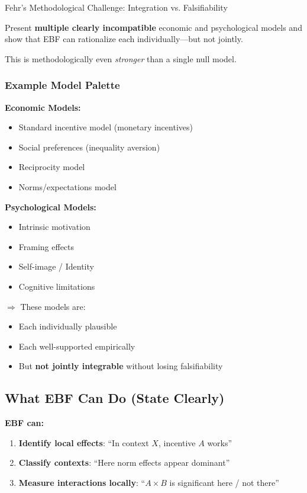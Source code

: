 \begin{chapter}{Fehr's Methodological Challenge: Integration vs. Falsifiability}
\begin{tcolorbox}[colback=green!5!white,colframe=green!75!black,title=\textbf{The Multiple Models Strategy}]
Present \textbf{multiple clearly incompatible} economic and psychological models
and show that EBF can rationalize each individually---but not jointly.

This is methodologically even \textit{stronger} than a single null model.
\end{tcolorbox}

\subsubsection{Example Model Palette}

\textbf{Economic Models:}
\begin{itemize}[noitemsep]
    \item Standard incentive model (monetary incentives)
    \item Social preferences (inequality aversion)
    \item Reciprocity model
    \item Norms/expectations model
\end{itemize}

\textbf{Psychological Models:}
\begin{itemize}[noitemsep]
    \item Intrinsic motivation
    \item Framing effects
    \item Self-image / Identity
    \item Cognitive limitations
\end{itemize}

$\Rightarrow$ These models are:
\begin{itemize}[noitemsep]
    \item Each individually plausible
    \item Each well-supported empirically
    \item But \textbf{not jointly integrable} without losing falsifiability
\end{itemize}

\subsection{What EBF Can Do (State Clearly)}

\textbf{EBF can:}
\begin{enumerate}[noitemsep]
    \item \textbf{Identify local effects}: ``In context $X$, incentive $A$ works''
    \item \textbf{Classify contexts}: ``Here norm effects appear dominant''
    \item \textbf{Measure interactions locally}: ``$A \times B$ is significant here / not there''
\end{enumerate}


\end{chapter}
